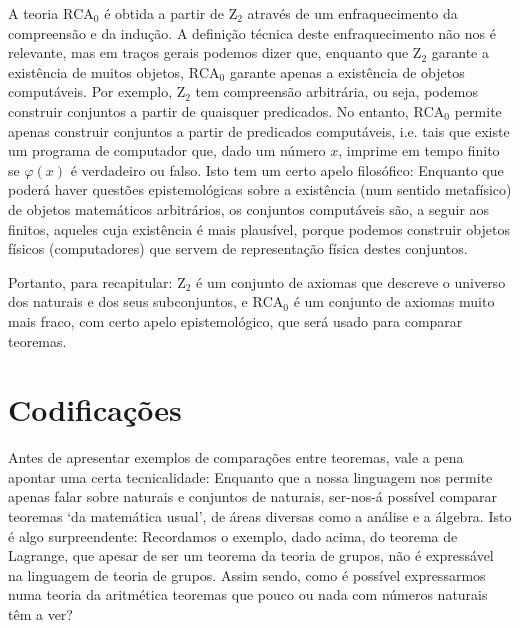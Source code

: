 A teoria $\mathrm{RCA}_0$ é obtida a partir de $\mathrm{Z}_2$ através de um enfraquecimento da compreensão e da indução. A definição técnica deste enfraquecimento não nos é relevante, mas em traços gerais podemos dizer que, enquanto que $\mathrm{Z}_2$ garante a existência de muitos objetos, $\mathrm{RCA}_0$ garante apenas a existência de objetos computáveis. Por exemplo, $\mathrm{Z}_2$ tem compreensão arbitrária, ou seja, podemos construir conjuntos a partir de quaisquer predicados. No entanto, $\mathrm{RCA}_0$ permite apenas construir conjuntos a partir de predicados computáveis, i.e. tais que existe um programa de computador que, dado um número $x$, imprime em tempo finito se $\varphi(x)$ é verdadeiro ou falso. Isto tem um certo apelo filosófico: Enquanto que poderá haver questões epistemológicas sobre a existência (num sentido metafísico) de objetos matemáticos arbitrários, os conjuntos computáveis são, a seguir aos finitos, aqueles cuja existência é mais plausível, porque podemos construir objetos físicos (computadores) que servem de representação física destes conjuntos.

Portanto, para recapitular: $\mathrm{Z}_2$ é um conjunto de axiomas que descreve o universo dos naturais e dos seus subconjuntos, e $\mathrm{RCA}_0$ é um conjunto de axiomas muito mais fraco, com certo apelo epistemológico, que será usado para comparar teoremas.

\section*{Codificações}

Antes de apresentar exemplos de comparações entre teoremas, vale a pena apontar uma certa tecnicalidade: Enquanto que a nossa linguagem nos permite apenas falar sobre naturais e conjuntos de naturais, ser-nos-á possível comparar teoremas `da matemática usual', de áreas diversas como a análise e a álgebra. Isto é algo surpreendente: Recordamos o exemplo, dado acima, do teorema de Lagrange, que apesar de ser um teorema da teoria de grupos, não é expressável na linguagem de teoria de grupos. Assim sendo, como é possível expressarmos numa teoria da aritmética teoremas que pouco ou nada com números naturais têm a ver?

